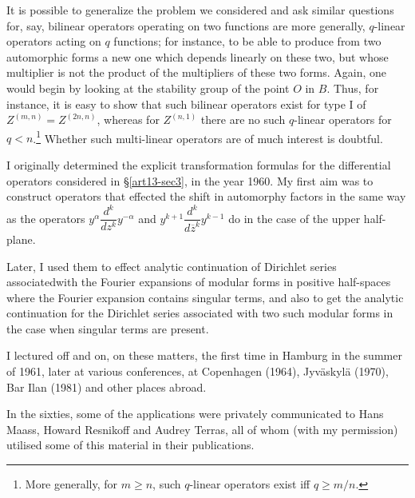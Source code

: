 It is possible to generalize the problem we considered and ask similar questions for, say, bilinear operators operating on two functions are more generally, $q$-linear operators acting on $q$ functions; for instance, to be able to produce from two automorphic forms a new one which depends linearly on these two, but whose multiplier is not the product of the multipliers of these two forms. Again, one would begin by looking at the stability group of the point $O$ in $B$. Thus, for instance, it is easy to show that such bilinear operators exist for type I of $Z^{(m,n)}=Z^{(2n,n)}$, whereas for $Z^{(n,1)}$ there are no such $q$-linear operators for $q<n$.\footnote[13]{More generally, for $m\geq n$, such $q$-linear operators exist iff $q\geq m/n$.} Whether such multi-linear operators are of much interest is doubtful.

I originally determined the explicit transformation formulas for the differential operators considered in \S\ref{art13-sec3}, in the year 1960. My first aim was to construct operators that effected the shift in automorphy factors in the same way as the operators $y^{\alpha}\dfrac{d^{k}}{dz^{k}}y^{-\alpha}$ and $y^{k+1}\dfrac{d^{k}}{d\overline{z}^{k}}y^{k-1}$ do in the case of the upper half-plane.

Later, I used them to effect analytic continuation of Dirichlet series associated\pageoriginale with the Fourier expansions of modular forms in positive half-spaces where the Fourier expansion contains singular terms, and also to get the analytic continuation for the Dirichlet series associated with two such modular forms in the case when singular terms are present.

I lectured off and on, on these matters, the first time in Hamburg in the summer of 1961, later at various conferences, at Copenhagen (1964), Jyv\"askyl\"a (1970), Bar Ilan (1981) and other places abroad.

In the sixties, some of the applications were privately communicated to Hans Maass, Howard Resnikoff and Audrey Terras, all of whom (with my permission) utilised some of this material in their publications.

